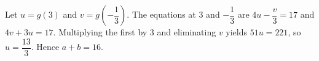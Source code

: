 Let $u=g(3)$ and $v=g(-\dfrac{1}{3})$. The equations at 3 and $-\dfrac{1}{3}$ are $4u-\dfrac{v}{3}=17$ and $4v+3u=17$. Multiplying the first by 3 and eliminating $v$ yields $51u=221$, so $u=\dfrac{13}{3}$. Hence $\boxed{a+b=16}$.
